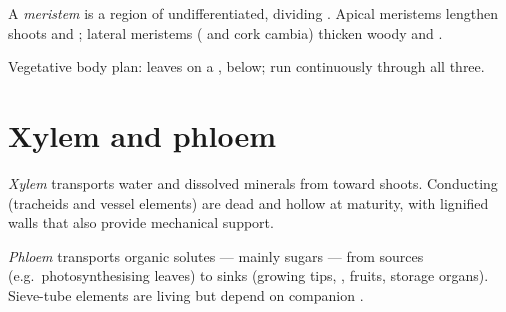 \begin{definition}[Meristems]\label{def:g12:plant-biology:meristem}
A \emph{meristem} is a region of undifferentiated,
dividing . Apical meristems lengthen shoots and ; lateral
meristems ( and cork cambia) thicken woody  and .
\end{definition}

\begin{omfigure}

{\small Vegetative body plan: leaves on a ,  below;  run continuously through all three.}
\end{omfigure}

\section{Xylem and phloem}

\begin{definition}[Xylem]\label{def:g12:plant-biology:xylem}
\emph{Xylem} transports water and dissolved minerals from
 toward shoots. Conducting  (tracheids and vessel elements) are
dead and hollow at maturity, with lignified walls that also provide
mechanical support.
\end{definition}

\begin{definition}[Phloem]\label{def:g12:plant-biology:phloem}
\emph{Phloem} transports organic solutes --- mainly
sugars --- from sources (e.g.\ photosynthesising leaves) to sinks
(growing tips, , fruits, storage organs). Sieve-tube elements are
living but depend on companion .
\end{definition}

